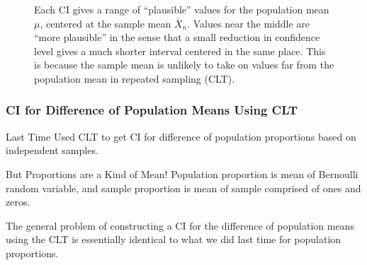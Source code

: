 \documentclass[handout]{beamer}
\begin{document}
\begin{frame}

\begin{figure}
\centering
{}
\singlespacing
\caption{\small  Each CI gives a range of ``plausible'' values for the population mean $\mu$, centered at the sample mean $\bar{X}_n$. Values near the middle are ``more plausible'' in the sense that a small reduction in confidence level gives a much shorter interval centered in the same place. This is because the sample mean is unlikely to take on values far from the population mean in repeated sampling (CLT).}
\end{figure}

\end{frame}
\begin{frame}
\frametitle{CI for Difference of Population Means Using CLT}

\begin{block}{Last Time}
Used CLT to get CI for difference of population proportions based on independent samples.
\end{block}

\begin{block}{But Proportions are a Kind of Mean!}
Population proportion is mean of Bernoulli random variable, and sample proportion is mean of sample comprised of ones and zeros.
\end{block}

\vspace{2em}

\alert{The general problem of constructing a CI for the difference of population means using the CLT is essentially identical to what we did last time for population proportions.}

\end{frame}
\end{document}
